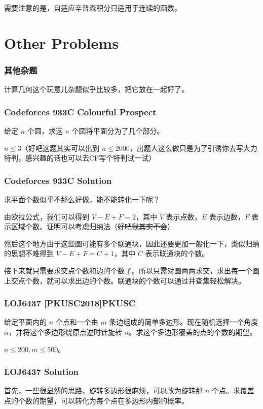 \documentclass[10pt]{beamer}
\begin{document}
\begin{CJK}{UTF8}{gkai}
\begin{spacing}{1.2}
\begin{frame}
			需要注意的是，自适应辛普森积分只适用于连续的函数。

		\end{frame}
		\section{Other Problems}
		\begin{frame}
			\frametitle{其他杂题}

			计算几何这个玩意儿杂题似乎比较多，把它放在一起好了。

		\end{frame}
		\begin{frame}
			\frametitle{Codeforces 933C Colourful Prospect}

			给定 $n$ 个圆，求这 $n$ 个圆将平面分为了几个部分。 \pause

			$n \le 3$（好吧这题其实可以出到 $n \le 2000$，出题人这么做只是为了引诱你去写大力特判，感兴趣的话也可以去CF写个特判试一试）

		\end{frame}
		\begin{frame}
			\frametitle{Codeforces 933C Solution}

			求平面个数似乎不那么好做，能不能转化一下呢？ \pause

			由欧拉公式，我们可以得到 $V - E + F = 2$，其中 $V$ 表示点数，$E$ 表示边数，$F$ 表示区域个数。证明可以考虑归纳法（\sout{好吧我其实不会}） \pause

			然后这个地方由于这些圆可能有多个联通块，因此还要更加一般化一下，类似归纳的思想不难得到 $V - E + F = C + 1$，其中 $C$ 表示联通块的个数。 \pause

			接下来就只需要求交点个数和边的个数了。所以只需对圆两两求交，求出每一个圆上交点个数，就可以求出边的个数。联通块的个数可以通过并查集轻松解决。

		\end{frame}
		\begin{frame}
			\frametitle{LOJ6437 [PKUSC2018]PKUSC}

			给定平面内的 $n$ 个点和一个由 $m$ 条边组成的简单多边形。现在随机选择一个角度 $\alpha$，并将这个多边形绕原点逆时针旋转 $\alpha$。求这个多边形覆盖的点的个数的期望。 \pause

			$n \le 200,m \le 500$。

		\end{frame}
		\begin{frame}
			\frametitle{LOJ6437 Solution}

			首先，一些很显然的思路，旋转多边形很麻烦，可以改为旋转那 $n$ 个点。求覆盖点的个数的期望，可以转化为每个点在多边形内部的概率。 \pause


\end{frame}
\end{spacing}
\end{CJK}
\end{document}
